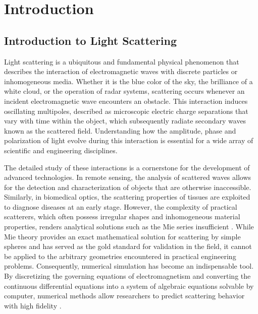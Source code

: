 \documentclass[class=report, crop=false]{standalone}
\begin{document}
\chapter{Introduction}

\section{Introduction to Light Scattering}

Light scattering is a ubiquitous and fundamental physical phenomenon that describes the interaction of electromagnetic waves with discrete particles or inhomogeneous media. Whether it is the blue color of the sky, the brilliance of a white cloud, or the operation of radar systems, scattering occurs whenever an incident electromagnetic wave encounters an obstacle. This interaction induces oscillating multipoles, described as microscopic electric charge separations that vary with time within the object, which subsequently radiate secondary waves known as the scattered field. Understanding how the amplitude, phase and polarization of light evolve during this interaction is essential for a wide array of scientific and engineering disciplines.

\vspace{12pt}

The detailed study of these interactions is a cornerstone for the development of advanced technologies. In remote sensing, the analysis of scattered waves allows for the detection and characterization of objects that are otherwise inaccessible. Similarly, in biomedical optics, the scattering properties of tissues are exploited to diagnose diseases at an early stage. However, the complexity of practical scatterers, which often possess irregular shapes and inhomogeneous material properties, renders analytical solutions such as the Mie series insufficient \citep{Wriedt2012}. While Mie theory provides an exact mathematical solution for scattering by simple spheres and has served as the gold standard for validation in the field, it cannot be applied to the arbitrary geometries encountered in practical engineering problems. Consequently, numerical simulation has become an indispensable tool. By discretizing the governing equations of electromagnetism and converting the continuous differential equations into a system of algebraic equations solvable by computer, numerical methods allow researchers to predict scattering behavior with high fidelity \citep{Rumpf2014}.

\vspace{12pt}
\end{document}
